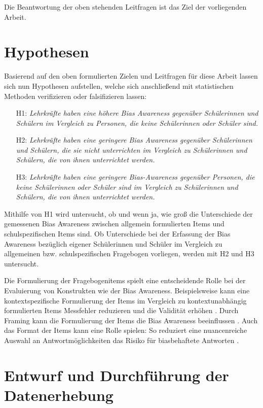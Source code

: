 Die Beantwortung der oben stehenden Leitfragen ist das Ziel der vorliegenden Arbeit.


\section{Hypothesen}
\label{sec:hypothesen}

Basierend auf den oben formulierten Zielen und Leitfragen für diese Arbeit lassen sich nun Hypothesen aufstellen, welche sich anschließend mit statistischen Methoden verifizieren oder falsifizieren lassen:

\begin{enumerate}
	\item[H1:] \emph{Lehrkräfte haben eine höhere Bias Awareness gegenüber Schülerinnen und Schülern im Vergleich zu Personen, die keine Schülerinnen oder Schüler sind.}
	\item[H2:] \emph{Lehrkräfte haben eine geringere Bias Awareness gegenüber Schülerinnen und Schülern, die sie nicht unterrichten im Vergleich zu Schülerinnen und Schülern, die von ihnen unterrichtet werden.}
	\item[H3:] \emph{Lehrkräfte haben eine geringere Bias-Awareness gegenüber Personen, die keine Schülerinnen oder Schüler sind im Vergleich zu Schülerinnen und Schülern, die von ihnen unterrichtet werden.}
\end{enumerate}

Mithilfe von H1 wird untersucht, ob und wenn ja, wie groß die Unterschiede der gemessenen Bias Awareness zwischen allgemein formulierten Items und schulspezifischen Items sind.
Ob Unterschiede bei der Erfassung der Bias Awareness bezüglich eigener Schülerinnen und Schüler im Vergleich zu allgemeinen bzw. schulspezifischen Fragebogen vorliegen, werden mit H2 und H3 untersucht.

Die Formulierung der Fragebogenitems spielt eine entscheidende Rolle bei der Evaluierung von Konstrukten wie der Bias Awareness.
Beispielsweise kann eine kontextspezifische Formulierung der Items im Vergleich zu kontextunabhängig formulierten Items Messfehler reduzieren und die Validität erhöhen \citep{bing2004incremental}.
Durch Framing kann die Formulierung der Items die Bias Awareness beeinflussen \citep{rohner2013reducing}.
Auch das Format der Items kann eine Rolle spielen:
So reduziert eine nuancenreiche Auswahl an Antwortmöglichkeiten das Risiko für biasbehaftete Antworten \citep{elson2017question}.


\section{Entwurf und Durchführung der Datenerhebung}
\label{sec:datenerhebung}